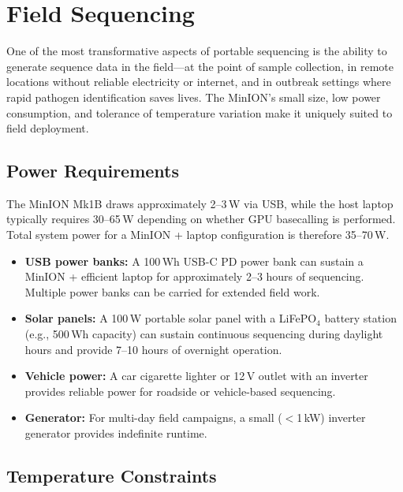 \section{Field Sequencing}
\label{sec:accessible:field}

One of the most transformative aspects of portable sequencing is the ability to generate sequence data in the field---at the point of sample collection, in remote locations without reliable electricity or internet, and in outbreak settings where rapid pathogen identification saves lives. The MinION's small size, low power consumption, and tolerance of temperature variation make it uniquely suited to field deployment.

\subsection{Power Requirements}
\label{subsec:accessible:power}

The MinION Mk1B draws approximately 2--3\,W via USB, while the host laptop typically requires 30--65\,W depending on whether GPU basecalling is performed. Total system power for a MinION + laptop configuration is therefore 35--70\,W.

\begin{itemize}[itemsep=2pt]
  \item \textbf{USB power banks:} A 100\,Wh USB-C PD power bank can sustain a MinION + efficient laptop for approximately 2--3 hours of sequencing. Multiple power banks can be carried for extended field work.
  \item \textbf{Solar panels:} A 100\,W portable solar panel with a LiFePO$_4$ battery station (e.g., 500\,Wh capacity) can sustain continuous sequencing during daylight hours and provide 7--10 hours of overnight operation.
  \item \textbf{Vehicle power:} A car cigarette lighter or 12\,V outlet with an inverter provides reliable power for roadside or vehicle-based sequencing.
  \item \textbf{Generator:} For multi-day field campaigns, a small ($<$1\,kW) inverter generator provides indefinite runtime.
\end{itemize}

\subsection{Temperature Constraints}
\label{subsec:accessible:temperature}

